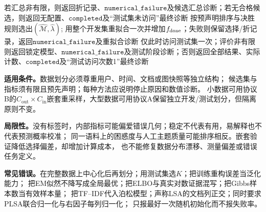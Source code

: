 \begin{AlgorithmContract}
\begin{algorithm}[tbp]
若汇总非有限，则返回折记录、$\mathtt{numerical\_failure}$及候选汇总诊断；若无合格候选，则返回无配置、$\mathtt{completed}$及“测试集未访问”最终诊断\;
按预声明排序与决胜规则选出$(\widehat{\mathcal M},\widehat\lambda)$;
用整个开发集重拟合一次并增加$f_{\rm done}$；失败则保留选择/折记录，返回$\mathtt{numerical\_failure}$及重拟合诊断\;
仅此时访问测试集一次；评价非有限则返回锁定模型、$\mathtt{numerical\_failure}$及测试阶段诊断；否则返回全部结果、实际计数、$\mathtt{completed}$及“测试访问次数1”最终诊断\;
\end{algorithm}
\end{AlgorithmContract}
\endgroup

\label{struct:V5-C08-CH28}
\textbf{适用条件。}数据划分必须尊重用户、时间、文档或图快照等独立结构；
候选集与指标须有限且预先声明；每种方法应说明停止原因和数值诊断。
小数据可用协议B的$C_{\mathrm{out}}\times C_{\mathrm{in}}$嵌套重采样，大型数据可用协议A保留独立开发/测试划分，但隔离原则不变。

\label{struct:V5-C08-CH29}
\textbf{局限性。}没有标签时，内部指标可能偏爱错误几何；稳定不代表有用，易解释也不代表预测概率校准；
同一语料上的困惑度与人工主题质量可能排序相反。嵌套验证降低选择偏差，却增加计算成本，
也不能修复数据分布漂移、测量偏差或错误任务定义。

\label{struct:V5-C08-CH30}
\textbf{常见错误。}在完整数据上中心化后再划分；用测试集选$K$；把训练重构误差当泛化能力；
把EM似然不降写成全局最优；把ELBO与真实对数证据混写；把Gibbs样本数当有效样本量；
把TF--IDF代入泊松模型；声称LSA的文档列正交；同时要求PLSA联合归一化与右因子每列归一化；
只报最好一次随机初始化而不报失败率。

